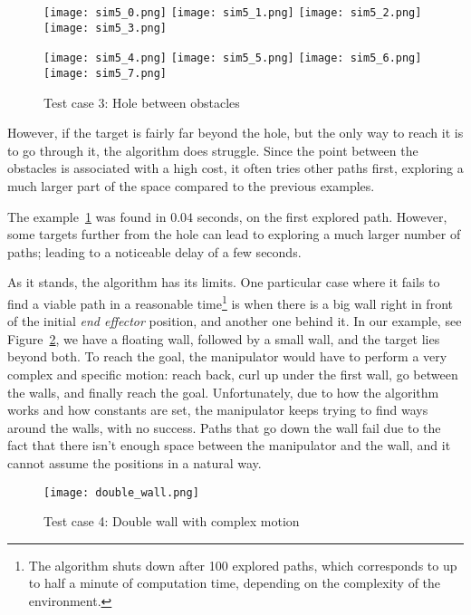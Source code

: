 \begin{figure}[ht]
  \centering
  \begin{minipage}{\textwidth}
    \texttt{[image: sim5\_0.png]}
    \texttt{[image: sim5\_1.png]}
    \texttt{[image: sim5\_2.png]}
    \texttt{[image: sim5\_3.png]}

    \texttt{[image: sim5\_4.png]}
    \texttt{[image: sim5\_5.png]}
    \texttt{[image: sim5\_6.png]}
    \texttt{[image: sim5\_7.png]}
  \end{minipage}
  \caption{Test case 3: Hole between obstacles}\label{fig:sim5}
\end{figure}

However, if the target is fairly far beyond the hole, but the only way to reach it is to go through it, the algorithm does struggle. Since the point between the obstacles is associated with a high cost, it often tries other paths first, exploring a much larger part of the space compared to the previous examples.

The example~\ref{fig:sim5} was found in $0.04$ seconds, on the first explored path. However, some targets further from the hole can lead to exploring a much larger number of paths; leading to a noticeable delay of a few seconds.

As it stands, the algorithm has its limits. One particular case where it fails to find a viable path in a reasonable time\footnote{The algorithm shuts down after 100 explored paths, which corresponds to up to half a minute of computation time, depending on the complexity of the environment.} is when there is a big wall right in front of the initial \textit{end effector} position, and another one behind it. In our example, see Figure~\ref{fig:d_wall}, we have a floating wall, followed by a small wall, and the target lies beyond both. To reach the goal, the manipulator would have to perform a very complex and specific motion: reach back, curl up under the first wall, go between the walls, and finally reach the goal. Unfortunately, due to how the algorithm works and how constants are set, the manipulator keeps trying to find ways around the walls, with no success. Paths that go down the wall fail due to the fact that there isn't enough space between the manipulator and the wall, and it cannot assume the positions in a natural way.

\begin{figure}
  \centering
  \texttt{[image: double\_wall.png]}
  \caption{Test case 4: Double wall with complex motion}\label{fig:d_wall}
\end{figure}

